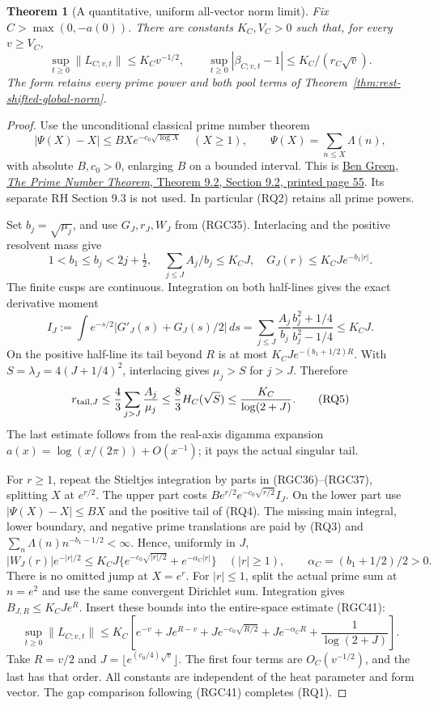\documentclass[11pt]{article}
\newtheorem{theorem}{Theorem}
\theoremstyle{remark}\newtheorem{remark}[theorem]{Remark}
\begin{document}
\begin{theorem}[A quantitative, uniform all-vector norm limit]
\label{thm:quantitative-rest-norm}
Fix \(C>\max(0,-a(0))\). There are constants \(K_C,V_C>0\)
such that, for every \(v\ge V_C\),
\[
 \sup_{t\ge0}\|L_{C;v,t}\|\le K_Cv^{-1/2},\qquad
 \sup_{t\ge0}|\beta_{C;v,t}-1|\le K_C/(r_C\sqrt v). \tag{RQ1}
\]
The form retains every prime power and both pool terms of
Theorem~\ref{thm:rest-shifted-global-norm}.
\end{theorem}
\begin{proof}
Use the unconditional classical prime number theorem
\[
 |\Psi(X)-X|\le BXe^{-c_0\sqrt{\log X}}\quad(X\ge1),
 \qquad\Psi(X)=\sum_{n\le X}\Lambda(n),             \tag{RQ2}
\]
with absolute \(B,c_0>0\), enlarging \(B\) on a bounded interval.
This is \href{https://people.maths.ox.ac.uk/greenbj/papers/primenumbers.pdf}
{Ben Green, \emph{The Prime Number Theorem}, Theorem 9.2,
Section 9.2, printed page 55}. Its separate RH Section 9.3 is
not used. In particular (RQ2) retains all prime powers.

Set \(b_j=\sqrt{\mu_j}\), and use \(G_J,r_J,W_J\) from (RGC35).
Interlacing and the positive resolvent mass give
\[
 1<b_1\le b_j<2j+\tfrac12,\quad
 \sum_{j\le J}A_j/b_j\le K_CJ,\quad
 G_J(r)\le K_CJ e^{-b_1|r|}.                       \tag{RQ3}
\]
The finite cusps are continuous. Integration on both half-lines
gives the exact derivative moment
\[
 I_J:=\int e^{-s/2}|G'_J(s)+G_J(s)/2|\,ds
 =\sum_{j\le J}\frac{A_j}{b_j}
                   \frac{b_j^2+1/4}{b_j^2-1/4}\le K_CJ. \tag{RQ4}
\]
On the positive half-line its tail beyond \(R\) is at most
\(K_CJ e^{-(b_1+1/2)R}\).
With \(S=\lambda_J=4(J+1/4)^2\), interlacing gives \(\mu_j>S\)
for \(j>J\). Therefore
\[
 r_{{\rm tail},J}\le\frac43\sum_{j>J}\frac{A_j}{\mu_j}
       \le\frac83H_C(\sqrt S)\le\frac{K_C}{\log(2+J)}. \tag{RQ5}
\]
The last estimate follows from the real-axis digamma expansion
\(a(x)=\log(x/(2\pi))+O(x^{-1})\); it pays the actual singular tail.

For \(r\ge1\), repeat the Stieltjes integration by parts in
(RGC36)--(RGC37), splitting \(X\) at \(e^{r/2}\).
The upper part costs
\(Be^{r/2}e^{-c_0\sqrt{r/2}}I_J\).
On the lower part use \(|\Psi(X)-X|\le BX\) and the positive
tail of (RQ4). The missing main integral, lower boundary, and
negative prime translations are paid by (RQ3) and
\(\sum_n\Lambda(n)n^{-b_1-1/2}<\infty\). Hence, uniformly in \(J\),
\[
 |W_J(r)|e^{-|r|/2}
 \le K_CJ\{e^{-c_0\sqrt{|r|/2}}+e^{-\alpha_C|r|}\}
 \quad(|r|\ge1),\qquad \alpha_C=(b_1+1/2)/2>0.     \tag{RQ6}
\]
There is no omitted jump at \(X=e^r\). For \(|r|\le1\), split
the actual prime sum at \(n=e^2\) and use the same convergent
Dirichlet sum. Integration gives \(B_{J,R}\le K_CJe^R\).
Insert these bounds into the entire-space estimate (RGC41):
\[
 \sup_{t\ge0}\|L_{C;v,t}\|
 \le K_C\left[e^{-v}+Je^{R-v}+Je^{-c_0\sqrt{R/2}}
                   +Je^{-\alpha_CR}+\frac1{\log(2+J)}\right]. \tag{RQ7}
\]
Take \(R=v/2\) and \(J=\lfloor e^{(c_0/4)\sqrt v}\rfloor\).
The first four terms are \(O_C(v^{-1/2})\), and the last has
that order. All constants are independent of the heat parameter and
form vector. The gap comparison following (RGC41) completes (RQ1).
\end{proof}
\end{document}
